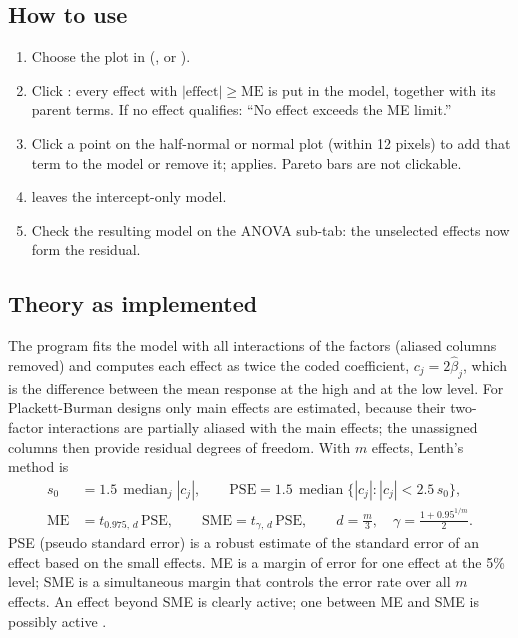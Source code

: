 \subsection*{How to use}
\begin{enumerate}
  \item Choose the plot in  (,  or ).
  \item Click : every effect with $|\text{effect}|\ge\text{ME}$ is
        put in the model, together with its parent terms. If no effect qualifies: ``No effect exceeds the ME
        limit.''
  \item Click a point on the half-normal or normal plot (within 12 pixels) to add that term to the model or
        remove it;  applies. Pareto bars are not clickable.
  \item {} leaves the intercept-only model.
  \item Check the resulting model on the ANOVA sub-tab: the unselected effects now form the residual.
\end{enumerate}

\subsection*{Theory as implemented}
The program fits the model with all interactions of the factors (aliased columns removed) and computes each
effect as twice the coded coefficient, $c_j=2\hat\beta_j$, which is the difference between the mean response
at the high and at the low level. For Plackett-Burman designs only main effects are estimated, because
their two-factor interactions are partially aliased with the main effects; the unassigned columns then
provide residual degrees of freedom. With $m$ effects, Lenth's method is
\begin{align}
  s_0&=1.5\,\operatorname{median}_j|c_j|, \qquad
  \text{PSE}=1.5\,\operatorname{median}\{|c_j|:|c_j|<2.5\,s_0\}, \label{eq:ch05-pse}\\
  \text{ME}&=t_{0.975,\,d}\,\text{PSE},\qquad \text{SME}=t_{\gamma,\,d}\,\text{PSE},\qquad
  d=\frac m3,\quad \gamma=\frac{1+0.95^{1/m}}{2}. \label{eq:ch05-me}
\end{align}
PSE (pseudo standard error) is a robust estimate of the standard error of an effect based on the small
effects. ME is a margin of error for one effect at the 5\% level; SME is a simultaneous margin that controls
the error rate over all $m$ effects. An effect beyond SME is clearly active; one between ME and SME is
possibly active \citep{lenth1989}.

